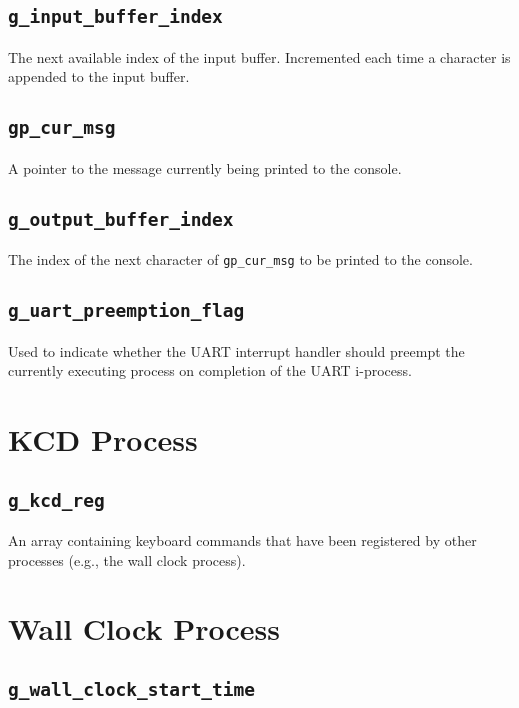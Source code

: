 \documentclass[12pt]{report}
\begin{document}
\subsection{\texttt{g_input_buffer_index}}

The next available index of the input buffer. Incremented each time a character is appended to the input buffer. 

\subsection{\texttt{gp_cur_msg}}

A pointer to the message currently being printed to the console.

\subsection{\texttt{g_output_buffer_index}}

The index of the next character of \texttt{gp_cur_msg} to be printed to the console.

\subsection{\texttt{g_uart_preemption_flag}}

Used to indicate whether the UART interrupt handler should preempt the currently executing process on completion of the UART i-process.

\section{KCD Process}

\subsection{\texttt{g_kcd_reg}}

An array containing keyboard commands that have been registered by other processes (e.g., the wall clock process).

\section{Wall Clock Process}

\subsection{\texttt{g_wall_clock_start_time}}
\end{document}
